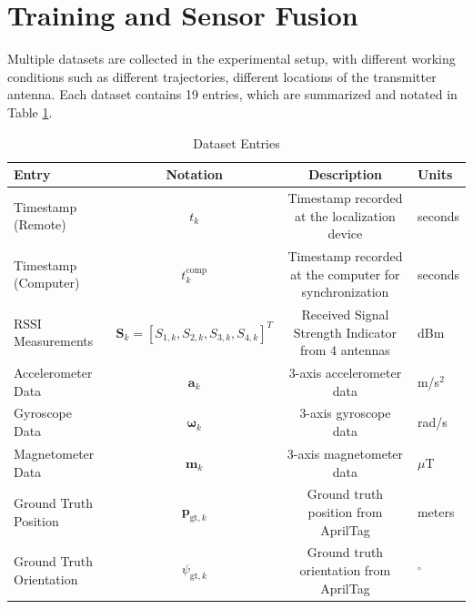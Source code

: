 \documentclass[subscriptcorrection,upint,varvw,barcolor=Goldenrod3,mathalfa=cal=euler,balance,hyphenate,pdf-a]{asmejour}
\begin{document}
\section{Training and Sensor Fusion}
Multiple datasets are collected in the experimental setup, with different working conditions such as different trajectories, different locations of the transmitter antenna. Each dataset contains 19 entries, which are summarized and notated in Table \ref{table:entrieslist}. 
\begin{table}[ht]
\centering
\caption{Dataset Entries}
\label{table:entrieslist}
\begin{tabular}{lccl}
\toprule
\textbf{Entry} & \textbf{Notation} & \textbf{Description} & \textbf{Units} \\
\midrule
Timestamp (Remote) & $t_k$ & Timestamp recorded at the localization device & seconds \\
Timestamp (Computer) & $t_k^{\mathrm{comp}}$ & Timestamp recorded at the computer for synchronization & seconds \\
RSSI Measurements & $\mathbf{S}_k=[S_{1,k},S_{2,k},S_{3,k},S_{4,k}]^T$ & Received Signal Strength Indicator from 4 antennas & dBm \\
Accelerometer Data & $\mathbf{a}_k$ & 3-axis accelerometer data & m/s$^2$ \\
Gyroscope Data & $\mathbf{\omega}_k$ & 3-axis gyroscope data & rad/s \\
Magnetometer Data & $\mathbf{m}_k$ & 3-axis magnetometer data & $\mu$T \\
Ground Truth Position & $\mathbf{p}_{\mathrm{gt},k}$ & Ground truth position from AprilTag & meters \\
Ground Truth Orientation & $\psi_{\mathrm{gt},k}$ & Ground truth orientation from AprilTag & $^\circ$ \\
\bottomrule
\end{tabular}
\end{table}
\end{document}
